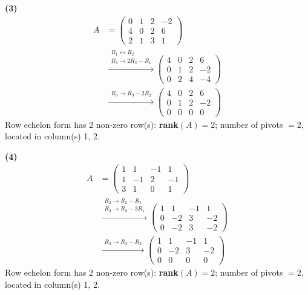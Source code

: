 \noindent\textbf{(3)}
\begin{align*}
A &= \begin{pmatrix}0 & 1 & 2 & -2 \\ 4 & 0 & 2 & 6 \\ 2 & 1 & 3 & 1\end{pmatrix} \\
&\xrightarrow{\substack{R_1\leftrightarrow R_2\\ R_3\to 2R_3-R_1}} \begin{pmatrix}4 & 0 & 2 & 6 \\ 0 & 1 & 2 & -2 \\ 0 & 2 & 4 & -4\end{pmatrix} \\
&\xrightarrow{\substack{R_3\to R_3-2R_2}} \begin{pmatrix}4 & 0 & 2 & 6 \\ 0 & 1 & 2 & -2 \\ 0 & 0 & 0 & 0\end{pmatrix}
\end{align*}
Row echelon form has 2 non-zero row(s): \textbf{rank}$(A)=2$; number of pivots $=2$, located in column(s) 1, 2.

\noindent\textbf{(4)}
\begin{align*}
A &= \begin{pmatrix}1 & 1 & -1 & 1 \\ 1 & -1 & 2 & -1 \\ 3 & 1 & 0 & 1\end{pmatrix} \\
&\xrightarrow{\substack{R_2\to R_2-R_1\\ R_3\to R_3-3R_1}} \begin{pmatrix}1 & 1 & -1 & 1 \\ 0 & -2 & 3 & -2 \\ 0 & -2 & 3 & -2\end{pmatrix} \\
&\xrightarrow{\substack{R_3\to R_3-R_2}} \begin{pmatrix}1 & 1 & -1 & 1 \\ 0 & -2 & 3 & -2 \\ 0 & 0 & 0 & 0\end{pmatrix}
\end{align*}
Row echelon form has 2 non-zero row(s): \textbf{rank}$(A)=2$; number of pivots $=2$, located in column(s) 1, 2.


